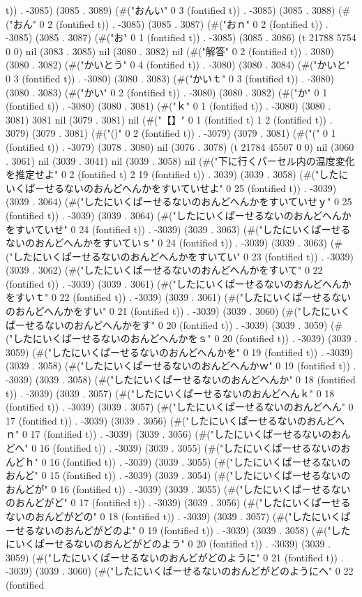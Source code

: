 t)) . -3085) (3085 . 3089) (#("おんい" 0 3 (fontified t)) . -3085) (3085 . 3088) (#("おん" 0 2 (fontified t)) . -3085) (3085 . 3087) (#("おｎ" 0 2 (fontified t)) . -3085) (3085 . 3087) (#("お" 0 1 (fontified t)) . -3085) (3085 . 3086) (t 21788 5754 0 0) nil (3083 . 3085) nil (3080 . 3082) nil (#("解答" 0 2 (fontified t)) . 3080) (3080 . 3082) (#("かいとう" 0 4 (fontified t)) . -3080) (3080 . 3084) (#("かいと" 0 3 (fontified t)) . -3080) (3080 . 3083) (#("かいｔ" 0 3 (fontified t)) . -3080) (3080 . 3083) (#("かい" 0 2 (fontified t)) . -3080) (3080 . 3082) (#("か" 0 1 (fontified t)) . -3080) (3080 . 3081) (#("ｋ" 0 1 (fontified t)) . -3080) (3080 . 3081) 3081 nil (3079 . 3081) nil (#("【】" 0 1 (fontified t) 1 2 (fontified t)) . 3079) (3079 . 3081) (#("()" 0 2 (fontified t)) . -3079) (3079 . 3081) (#("(" 0 1 (fontified t)) . -3079) (3078 . 3080) nil (3076 . 3078) (t 21784 45507 0 0) nil (3060 . 3061) nil (3039 . 3041) nil (3039 . 3058) nil (#("下に行くパーセル内の温度変化を推定せよ" 0 2 (fontified t) 2 19 (fontified t)) . 3039) (3039 . 3058) (#("したにいくぱーせるないのおんどへんかをすいていせよ" 0 25 (fontified t)) . -3039) (3039 . 3064) (#("したにいくぱーせるないのおんどへんかをすいていせｙ" 0 25 (fontified t)) . -3039) (3039 . 3064) (#("したにいくぱーせるないのおんどへんかをすいていせ" 0 24 (fontified t)) . -3039) (3039 . 3063) (#("したにいくぱーせるないのおんどへんかをすいていｓ" 0 24 (fontified t)) . -3039) (3039 . 3063) (#("したにいくぱーせるないのおんどへんかをすいてい" 0 23 (fontified t)) . -3039) (3039 . 3062) (#("したにいくぱーせるないのおんどへんかをすいて" 0 22 (fontified t)) . -3039) (3039 . 3061) (#("したにいくぱーせるないのおんどへんかをすいｔ" 0 22 (fontified t)) . -3039) (3039 . 3061) (#("したにいくぱーせるないのおんどへんかをすい" 0 21 (fontified t)) . -3039) (3039 . 3060) (#("したにいくぱーせるないのおんどへんかをす" 0 20 (fontified t)) . -3039) (3039 . 3059) (#("したにいくぱーせるないのおんどへんかをｓ" 0 20 (fontified t)) . -3039) (3039 . 3059) (#("したにいくぱーせるないのおんどへんかを" 0 19 (fontified t)) . -3039) (3039 . 3058) (#("したにいくぱーせるないのおんどへんかｗ" 0 19 (fontified t)) . -3039) (3039 . 3058) (#("したにいくぱーせるないのおんどへんか" 0 18 (fontified t)) . -3039) (3039 . 3057) (#("したにいくぱーせるないのおんどへんｋ" 0 18 (fontified t)) . -3039) (3039 . 3057) (#("したにいくぱーせるないのおんどへん" 0 17 (fontified t)) . -3039) (3039 . 3056) (#("したにいくぱーせるないのおんどへｎ" 0 17 (fontified t)) . -3039) (3039 . 3056) (#("したにいくぱーせるないのおんどへ" 0 16 (fontified t)) . -3039) (3039 . 3055) (#("したにいくぱーせるないのおんどｈ" 0 16 (fontified t)) . -3039) (3039 . 3055) (#("したにいくぱーせるないのおんど" 0 15 (fontified t)) . -3039) (3039 . 3054) (#("したにいくぱーせるないのおんどが" 0 16 (fontified t)) . -3039) (3039 . 3055) (#("したにいくぱーせるないのおんどがど" 0 17 (fontified t)) . -3039) (3039 . 3056) (#("したにいくぱーせるないのおんどがどの" 0 18 (fontified t)) . -3039) (3039 . 3057) (#("したにいくぱーせるないのおんどがどのよ" 0 19 (fontified t)) . -3039) (3039 . 3058) (#("したにいくぱーせるないのおんどがどのよう" 0 20 (fontified t)) . -3039) (3039 . 3059) (#("したにいくぱーせるないのおんどがどのように" 0 21 (fontified t)) . -3039) (3039 . 3060) (#("したにいくぱーせるないのおんどがどのようにへ" 0 22 (fontified 